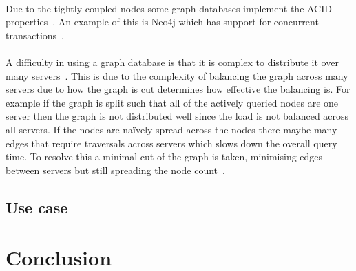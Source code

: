 \documentclass{CRPITStyle}
\renewcommand{\cite}{\citep}
\begin{document}
\paragraph{}
Due to the tightly coupled nodes some graph databases
implement the ACID properties~\cite{type_nosql,neo4j}.
An example of this is Neo4j which has support for
concurrent transactions~\cite{neo4j}.

\paragraph{}
A difficulty in using a graph database is that it is complex
to distribute it over many servers~\cite{sql_nosql}.
This is due to the complexity of balancing the
graph across many servers due to how the graph is
cut determines how effective the balancing is.
For example if the graph is split such that all of the
actively queried nodes are one server then the graph is
not distributed well since the load is not balanced across
all servers. If the nodes are naïvely spread across the nodes
there maybe many edges that require traversals across servers
which slows down the overall query time.
To resolve this a minimal cut of the graph is taken, minimising edges
between servers but still spreading the node count~\cite{neo4j}.

\subsection{Use case}




\cite{nosql_performance}

\section{Conclusion}




\end{document}

